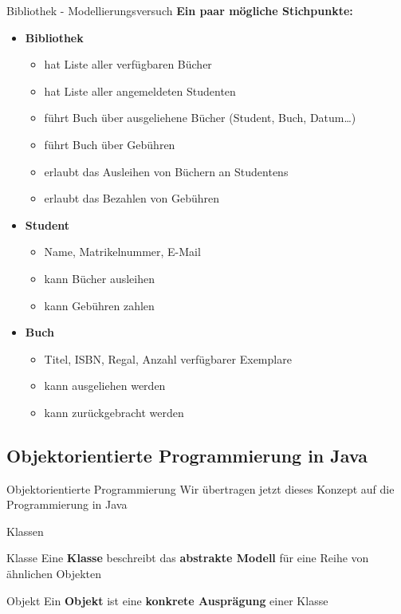\documentclass[18pt]{beamer}
\begin{document}
\begin{frame}{Bibliothek - Modellierungsversuch}
    \textbf{Ein paar mögliche Stichpunkte:}
    \begin{itemize}
        \item \textbf{Bibliothek}
        \begin{itemize}
            \item hat Liste aller verfügbaren Bücher
            \item hat Liste aller angemeldeten Studenten
            \item führt Buch über ausgeliehene Bücher (Student, Buch, Datum\dots)
            \item führt Buch über Gebühren
            \item erlaubt das Ausleihen von Büchern an Studentens
            \item erlaubt das Bezahlen von Gebühren
        \end{itemize}
        \pause
        \item \textbf{Student}
        \begin{itemize}
            \item Name, Matrikelnummer, E-Mail
            \item kann Bücher ausleihen
            \item kann Gebühren zahlen
        \end{itemize}
        \pause
        \item \textbf{Buch}
        \begin{itemize}
            \item Titel, ISBN, Regal, Anzahl verfügbarer Exemplare
            \item kann ausgeliehen werden
            \item kann zurückgebracht werden
        \end{itemize}
    \end{itemize}
\end{frame}

\subsection{Objektorientierte Programmierung in Java}

\begin{frame}{Objektorientierte Programmierung}
    Wir übertragen jetzt dieses Konzept auf die Programmierung in Java
\end{frame}

\begin{frame}{Klassen}
    \begin{block}{Klasse}
        Eine \textbf{Klasse} beschreibt das \textbf{abstrakte Modell} für eine Reihe von ähnlichen Objekten
    \end{block}

    \begin{block}{Objekt}
        Ein \textbf{Objekt} ist eine \textbf{konkrete Ausprägung} einer Klasse
    \end{block}
\end{frame}
\end{document}
